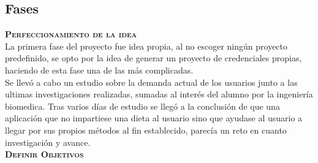\subsection{Fases}
\textbf{\textsc{Perfeccionamiento de la idea}}\\
La primera fase del proyecto fue idea propia, al no escoger ningún proyecto predefinido, se opto por la idea de generar un proyecto de credenciales propias, haciendo de esta fase una de las más complicadas.\\
Se llevó a cabo un estudio sobre la demanda actual de los usuarios junto a las ultimas investigaciones realizadas, sumadas al interés del alumno por la ingeniería biomedica. Tras varios días de estudio se llegó a la conclusión de que una aplicación que no impartiese una dieta al usuario sino que ayudase al usuario a llegar por sus propios métodos al fin establecido, parecía un reto en cuanto investigación y avance.\\
\textbf{\textsc{Definir Objetivos}}\\

